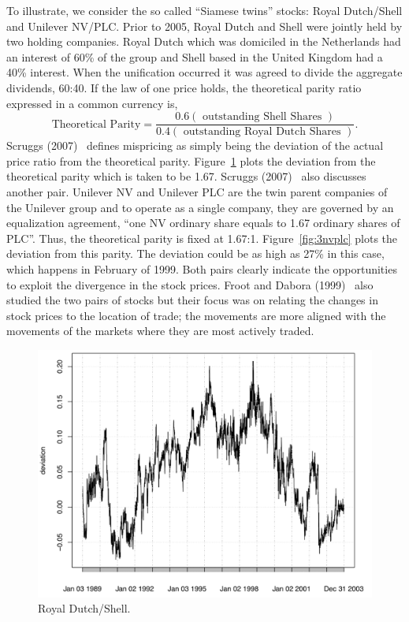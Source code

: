 To illustrate, we consider the so called ``Siamese twins'' stocks: Royal Dutch/Shell and Unilever NV/PLC. Prior to 2005, Royal Dutch and Shell were jointly held by two holding companies. Royal Dutch which was domiciled in the Netherlands had an interest of 60\% of the group and Shell based in the United Kingdom had a 40\% interest. When the unification occurred it was agreed to divide the aggregate dividends, 60:40. If the law of one price holds, the theoretical parity ratio expressed in a common currency is,
	\[
	\text{Theoretical Parity}= \frac{0.6 (\text{ outstanding Shell Shares })}{0.4 (\text{ outstanding Royal Dutch Shares })}.
	\]
Scruggs (2007)~\cite{scruggs} defines mispricing as simply being the deviation of the actual price ratio from the theoretical parity. Figure~\ref{fig:3royal} plots the deviation from the theoretical parity which is taken to be 1.67. Scruggs (2007)~\cite{scruggs} also discusses another pair. Unilever NV and Unilever PLC are the twin parent companies of the Unilever group and to operate as a single company, they are governed by an equalization agreement, ``one NV ordinary share equals to 1.67 ordinary shares of PLC''. Thus, the theoretical parity is fixed at 1.67:1. Figure~\ref{fig:3nvplc} plots the deviation from this parity. The deviation could be as high as 27\% in this case, which happens in February of 1999. Both pairs clearly indicate the opportunities to exploit the divergence in the stock prices. Froot and Dabora (1999)~\cite{froot1999stock} also studied the two pairs of stocks but their focus was on relating the changes in stock prices to the location of trade; the movements are more aligned with the movements of the markets where they are most actively traded.

	\begin{figure}[!ht]
	\centering
	\includegraphics[width=\textwidth]{chapters/chapter_stat_ts/figures/471.png}
	\caption{Royal Dutch/Shell. \label{fig:3royal}}
	\end{figure}
	
